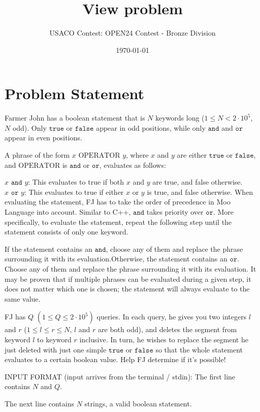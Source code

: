 \documentclass[12pt]{article}
\title{View problem}
\author{USACO Contest: OPEN24 Contest - Bronze Division}
\date{\today}
\begin{document}
\maketitle

\section*{Problem Statement}


Farmer John has a boolean statement that is $N$ keywords long
($1 \leq N < 2 \cdot 10^5$, $N$ odd). Only $\texttt{true}$ or $\texttt{false}$
appear in odd positions, while only $\texttt{and}$ and $\texttt{or}$ appear in
even positions.

A phrase of the form $x\text{ OPERATOR }y$, where $x$ and $y$ are either
$\texttt{true}$ or $\texttt{false}$, and $\text{OPERATOR}$ is $\texttt{and}$ or
$\texttt{or}$, evaluates as follows:

$x\texttt{ and }y$: This evaluates to true if both $x$ and $y$ are true, and
false otherwise.$x\texttt{ or }y$: This evaluates to true if either $x$ or $y$ is true, and
false otherwise.
When evaluating the statement, FJ has to take the order of precedence in Moo
Language into account. Similar to C++, $\texttt{and}$ takes priority over
$\texttt{or}$. More specifically, to evaluate the statement, repeat the
following step until the statement consists of only one keyword.

If the statement contains an $\texttt{and}$, choose any of them and replace
the phrase surrounding it with its evaluation.Otherwise, the statement contains an $\texttt{or}$. Choose any of them and
replace the phrase surrounding it with its evaluation.
It may be proven that if multiple phrases can be evaluated during a given step,
it does not matter which one is chosen; the statement will always evaluate to
the same value.

FJ has $Q$ $(1 \leq Q \leq 2 \cdot 10^5)$ queries. In each query, he gives you
two integers $l$ and $r$ ($1 \leq l \leq r \leq N$, $l$ and $r$ are both odd),
and deletes the segment from keyword $l$ to keyword $r$ inclusive. In turn, he
wishes to replace the segment he just deleted with just one simple
$\texttt{true}$ or $\texttt{false}$ so that the whole statement evaluates to a
certain boolean value. Help FJ determine if it's possible!

INPUT FORMAT (input arrives from the terminal / stdin):
The first line contains $N$ and $Q$.

The next line contains $N$ strings, a valid boolean statement.
\end{document}
